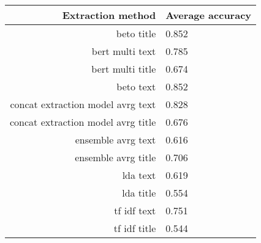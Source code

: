 \begin{tabular}{|r|l|}
  \hline
  Extraction method & Average accuracy \\ 
  \hline
  beto title & 0.852 \\ 
  \hline
  bert multi text & 0.785 \\ 
  \hline
  bert multi title & 0.674 \\ 
  \hline
  beto text & 0.852 \\ 
  \hline
  concat extraction model avrg text & 0.828 \\ 
  \hline
  concat extraction model avrg title & 0.676 \\ 
  \hline
  ensemble avrg text & 0.616 \\ 
  \hline
  ensemble avrg title & 0.706 \\ 
  \hline
  lda text & 0.619 \\ 
  \hline
  lda title & 0.554 \\ 
  \hline
  tf idf text & 0.751 \\ 
  \hline
  tf idf title & 0.544 \\ 
  \hline
\end{tabular}
